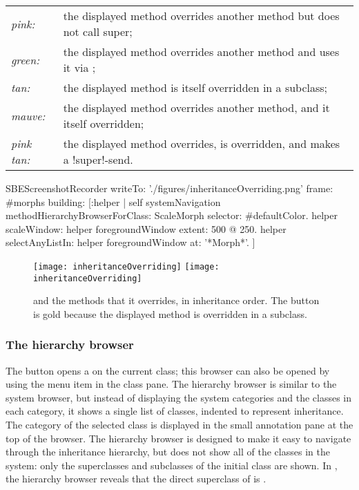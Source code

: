 \documentclass[a4paper,10pt,twoside]{book}
\begin{document}
\begin{tabular}{lp{9cm}}
	\emph{pink:} & the displayed method overrides another method but does not call super;\\
	\emph{green:} & the displayed method overrides another method and uses it via \super;\\
	\emph{tan:} & the displayed method is itself overridden in a subclass;\\
	\emph{mauve:} & the displayed method overrides another method, and it itself overridden;\\
	\emph{pink tan:} & the displayed method overrides, is overridden, and makes a \ct!super!-send.
\end{tabular}

\begin{ExecuteSmalltalkScript}
SBEScreenshotRecorder writeTo: './figures/inheritanceOverriding.png' frame: #morphs building: [:helper |
	self systemNavigation
		methodHierarchyBrowserForClass: ScaleMorph
		selector: #defaultColor.
	helper scaleWindow: helper foregroundWindow extent: 500 @ 250.
	helper selectAnyListIn: helper foregroundWindow at: '*Morph*'.
]
\end{ExecuteSmalltalkScript}
\begin{figure}[tbp]
	\begin{center}
   \ifluluelse
		{\texttt{[image: inheritanceOverriding]}}
		{\texttt{[image: inheritanceOverriding]}}
	\end{center}
	\caption{ and the methods that it overrides, in inheritance order.
	The  button is gold because the displayed method is overridden in a subclass.}
	\label{fig:inheritanceOverriding}
\end{figure}


\subsubsection{The hierarchy browser}
\label{sec:hierarchy}

The  button opens a  on the current class; this browser can also be opened by using the  menu item in the class pane.
The hierarchy browser is similar to the system browser, but instead of displaying the system categories and the classes in each category, it shows a single list of classes, indented to represent inheritance.
The category of the selected class is displayed in the small annotation pane at the top of the browser.
The hierarchy browser is designed to make it easy to navigate through the inheritance hierarchy, but does not show all of the classes in the system: only the superclasses and subclasses of the initial class are shown.
In , the hierarchy browser reveals that the direct superclass of  is .
\end{document}
